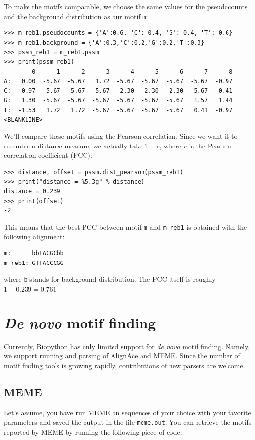 \documentclass{report}
\begin{document}
To make the motifs comparable, we choose the same values for the pseudocounts and the background distribution as our motif \verb|m|:
\begin{verbatim}
>>> m_reb1.pseudocounts = {'A':0.6, 'C': 0.4, 'G': 0.4, 'T': 0.6}
>>> m_reb1.background = {'A':0.3,'C':0.2,'G':0.2,'T':0.3}
>>> pssm_reb1 = m_reb1.pssm
>>> print(pssm_reb1)
        0      1      2      3      4      5      6      7      8
A:   0.00  -5.67  -5.67   1.72  -5.67  -5.67  -5.67  -5.67  -0.97
C:  -0.97  -5.67  -5.67  -5.67   2.30   2.30   2.30  -5.67  -0.41
G:   1.30  -5.67  -5.67  -5.67  -5.67  -5.67  -5.67   1.57   1.44
T:  -1.53   1.72   1.72  -5.67  -5.67  -5.67  -5.67   0.41  -0.97
<BLANKLINE>
\end{verbatim}
We'll compare these motifs using the Pearson correlation.
Since we want it to resemble a distance measure, we actually take
$1-r$, where $r$ is the Pearson correlation coefficient (PCC):
\begin{verbatim}
>>> distance, offset = pssm.dist_pearson(pssm_reb1)
>>> print("distance = %5.3g" % distance)
distance = 0.239
>>> print(offset)
-2
\end{verbatim}
This means that the best PCC between motif \verb|m| and  \verb|m_reb1| is obtained with the following alignment:
\begin{verbatim}
m:      bbTACGCbb
m_reb1: GTTACCCGG
\end{verbatim}
where \verb|b| stands for background distribution. The PCC itself is
roughly $1-0.239=0.761$.

\section{\emph{De novo} motif finding}
\label{sec:find}

Currently, Biopython has only limited support for \emph{de novo} motif
finding. Namely, we support running and parsing of AlignAce and
MEME. Since the number of motif finding tools is growing rapidly, 
contributions of new parsers are welcome. 

\subsection{MEME}
\label{sec:meme}

Let's assume, you have run MEME on sequences of your choice with your
favorite parameters and saved the output in the file
\verb|meme.out|. You can retrieve the motifs reported by MEME by
running the following piece of code:
\end{document}
